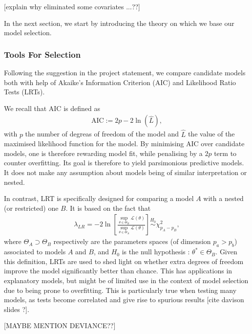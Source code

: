 \documentclass[a4paper, 12pt,oneside]{article}
\begin{document}
			[explain why eliminated some covariates ...??]

			In the next section, we start by introducing the theory on which we base our model selection. 
			\subsubsection{Tools For Selection}
				Following the suggestion in the project statement, we compare candidate models both with help of Akaike's Information Criterion (AIC) and Likelihood Ratio Tests (LRTs). 

				We recall that AIC is defined as 
				\begin{gather}
					\text{AIC}:=2p-2\ln(\hat L),
				\end{gather}
				with $p$ the number of degreas of freedom of the model and $\hat L$ the value of the maximised likelihood function for the model. By minimising AIC over candidate models, one is therefore rewarding model fit, while penalising by a $2p$ term to counter overfitting. Its goal is therefore to yield parsimonious predictive models. It does not make any assumption about models being of similar interpretation or nested. 

				In contrast, LRT is specifically designed for comparing a model $A$ with a nested (or restricted) one $B$. It is based on the fact that 
				\begin{gather}
					\lambda_{LR}=-2\ln\left[\frac{\sup_{\theta\in\Theta_B}\mathcal{L(\theta)}}{\sup_{\theta\in\Theta_A}\mathcal{L(\theta)}}\right]
					\overset{H_0}{\sim} \chi^2_{p_A-p_B},
				\end{gather}
				where $\Theta_A\supset\Theta_B$ respectively are the parameters spaces (of dimension $p_a>p_b$) associated to models $A$ and $B$, and $H_0$ is the null hypothesis : $\theta^*\in\Theta_B$. Given this definition, LRTs are used to shed light on whether extra degrees of freedom improve the model significantly better than chance. This has applications in explanatory models, but might be of limited use in the context of model selection due to being prone to overfitting. This is particularly true when testing many models, as tests become correlated and give rise to spurious results [cite davison slides ?].

				[MAYBE MENTION DEVIANCE??]
\end{document}
